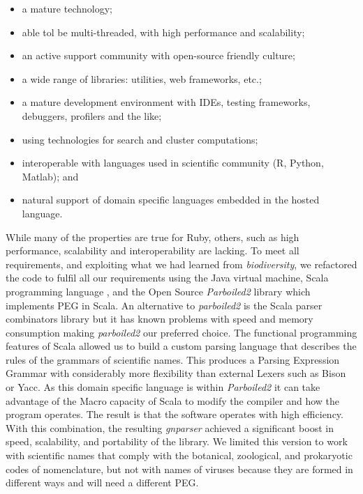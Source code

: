 \documentclass{bmcart}
\begin{document}
\begin{itemize}

    \item a mature technology;

    \item able tol be multi-threaded, with high performance and scalability;

    \item an active support community with open-source friendly culture;

    \item a wide range of libraries: utilities, web frameworks, etc.;

    \item a mature development environment with IDEs, testing frameworks, debuggers,  profilers and the like;

    \item using technologies for search and cluster computations;

    \item interoperable with languages used in scientific community (R,
      Python, Matlab); and

    \item natural support of domain specific languages embedded in the hosted
      language.

\end{itemize}

While many of the properties are true for Ruby, others, such as high
performance, scalability and interoperability are lacking. To meet all
requirements, and exploiting what we had learned from \textit{biodiversity}, we
refactored the code to fulfil all our requirements using the Java virtual machine, Scala
programming language \cite{odersky2004overview}, and the Open Source
\textit{Parboiled2} library \cite{parboiled2} which implements PEG in Scala. An
alternative to \textit{parboiled2} is the Scala parser combinators library
\cite{moors2008parser} but it has known problems with speed and memory consumption
making \textit{parboiled2} our preferred choice. The functional programming features of Scala allowed us to build a custom
parsing language that describes the rules of the grammars of scientific names.
This produces a Parsing Expression Grammar with considerably more
flexibility than external Lexers such as Bison or Yacc. As this domain specific
language is within \textit{Parboiled2} it can take advantage of the Macro
capacity of Scala \cite{Burmako:2013:SML:2489837.2489840} to modify the
compiler and how the program operates. The result is that the software operates
with high efficiency. With this combination, the resulting \textit{gnparser} achieved a significant
boost in speed, scalability, and portability of the library.  We limited this
version to work with scientific names that comply with the botanical,
zoological, and prokaryotic codes of nomenclature, but not with names of viruses because they are
formed in different ways \cite{ICTV, Patterson:inpress-a} and will need a different PEG.
\end{document}
